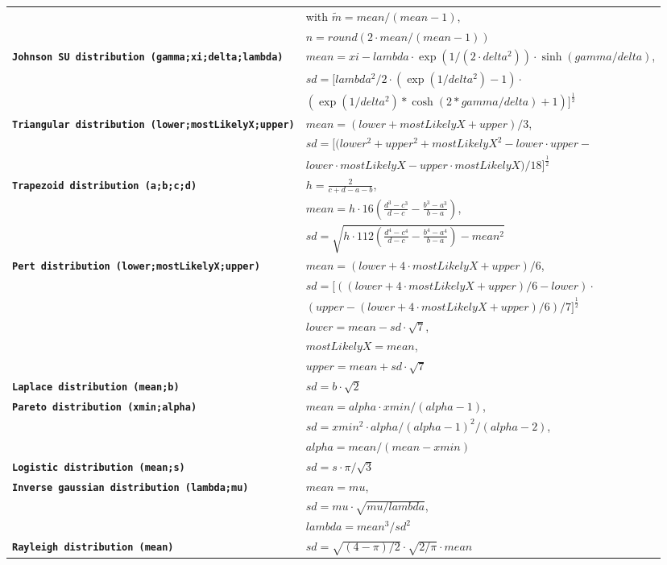\documentclass{svmono}
\def\cm#1{\textbf{\texttt{#1}}}
\begin{document}
{\begin{longtable}{l|l}
~ & with $\widetilde m = mean/(mean-1)$,\\
~ & $n = round(2\cdot mean/(mean-1))$ \\
\cm{Johnson SU distribution (gamma;xi;delta;lambda)} & $mean = xi-lambda\cdot\exp(1/(2\cdot delta^2))\cdot\sinh(gamma/delta)$,\\
~ & $sd = \Big[lambda^2/2\cdot(\exp(1/delta^2)-1)\cdot$\\
~ & $(\exp(1/delta^2)*\cosh(2*gamma/delta)+1)\Big]^{\frac{1}{2}}$ \\
\cm{Triangular distribution (lower;mostLikelyX;upper)} & $mean = (lower+mostLikelyX+upper)/3$,\\
~ & $sd = \Big[(lower^2+upper^2+mostLikelyX^2-lower\cdot upper-$\\
~ & $lower\cdot mostLikelyX-upper\cdot mostLikelyX)/18\Big]^{\frac{1}{2}}$ \\
\cm{Trapezoid distribution (a;b;c;d)} & $h = \frac{2}{c+d-a-b}$,\\
~ & $mean = h\cdot{1}{6}\left(\frac{d^3-c^3}{d-c}-\frac{b^3-a^3}{b-a}\right)$,\\
~ & $sd = \sqrt{h\cdot{1}{12}\left(\frac{d^4-c^4}{d-c}-\frac{b^4-a^4}{b-a}\right)-mean^2}$ \\
\cm{Pert distribution (lower;mostLikelyX;upper)} & $mean = (lower+4\cdot mostLikelyX+upper)/6$,\\
~ & $sd = \Big[((lower+4\cdot mostLikelyX+upper)/6-lower)\cdot$\\
~ & $(upper-(lower+4\cdot mostLikelyX+upper)/6)/7\Big]^{\frac{1}{2}}$ \\
~ & $lower = mean-sd\cdot\sqrt{7}$,\\
~ & $mostLikelyX = mean$,\\
~ & $upper = mean+sd\cdot\sqrt{7}$ \\
\cm{Laplace distribution (mean;b)} & $sd = b\cdot\sqrt{2}$ \\
\cm{Pareto distribution (xmin;alpha)} & $mean = alpha\cdot xmin/(alpha-1)$,\\
~ & $sd = xmin^2\cdot alpha/(alpha-1)^2/(alpha-2)$,\\
~ & $alpha = mean/(mean-xmin)$ \\
\cm{Logistic distribution (mean;s)} & $sd = s\cdot\pi/\sqrt{3}$ \\
\cm{Inverse gaussian distribution (lambda;mu)} & $mean = mu$,\\
~ & $sd = mu\cdot\sqrt{mu/lambda}$,\\
~ & $lambda = mean^3/sd^2$ \\
\cm{Rayleigh distribution (mean)} & $sd = \sqrt{(4-\pi)/2}\cdot\sqrt{2/\pi}\cdot mean$ \\

\end{longtable}}
\end{document}

